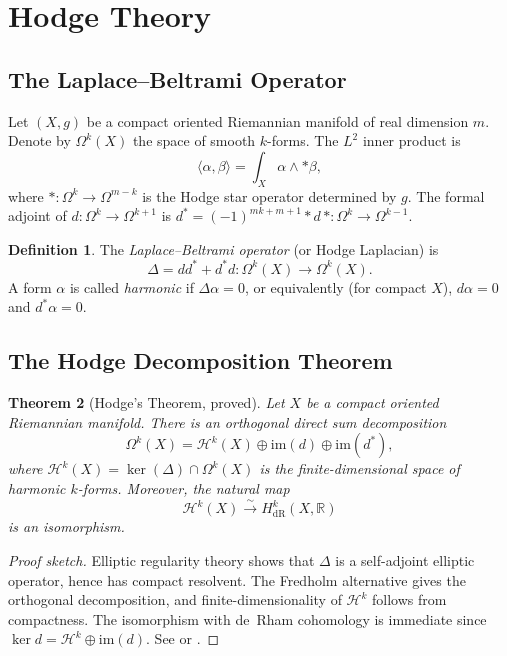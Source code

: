 \documentclass[12pt,a4paper]{amsart}
\newtheorem{theorem}{Theorem}[section]
\theoremstyle{definition}
\newtheorem{definition}[theorem]{Definition}
\theoremstyle{remark}
\begin{document}
\section{Hodge Theory}
\label{sec:hodge-theory}

\subsection{The Laplace–Beltrami Operator}

Let $(X,g)$ be a compact oriented Riemannian manifold of real dimension $m$.
Denote by $\Omega^k(X)$ the space of smooth $k$-forms. The $L^2$ inner product is
\[
  \langle \alpha, \beta \rangle = \int_X \alpha \wedge *\beta,
\]
where $*: \Omega^k \to \Omega^{m-k}$ is the Hodge star operator determined by $g$.
The formal adjoint of $d: \Omega^k \to \Omega^{k+1}$ is
$d^* = (-1)^{mk+m+1} * d\, * : \Omega^k \to \Omega^{k-1}$.

\begin{definition}
The \emph{Laplace–Beltrami operator} (or Hodge Laplacian) is
\[
  \Delta = dd^* + d^*d : \Omega^k(X) \longrightarrow \Omega^k(X).
\]
A form $\alpha$ is called \emph{harmonic} if $\Delta\alpha = 0$, or equivalently
(for compact $X$), $d\alpha = 0$ and $d^*\alpha = 0$.
\end{definition}

\subsection{The Hodge Decomposition Theorem}

\begin{theorem}[Hodge's Theorem, proved]
\label{thm:hodge-main}
Let $X$ be a compact oriented Riemannian manifold. There is an orthogonal direct
sum decomposition
\[
  \Omega^k(X) = \mathcal{H}^k(X) \oplus \mathrm{im}(d) \oplus \mathrm{im}(d^*),
\]
where $\mathcal{H}^k(X) = \ker(\Delta) \cap \Omega^k(X)$ is the finite-dimensional
space of harmonic $k$-forms. Moreover, the natural map
\[
  \mathcal{H}^k(X) \xrightarrow{\;\sim\;} H^k_{\mathrm{dR}}(X, \mathbb{R})
\]
is an isomorphism.
\end{theorem}

\begin{proof}[Proof sketch]
Elliptic regularity theory shows that $\Delta$ is a self-adjoint elliptic operator,
hence has compact resolvent. The Fredholm alternative gives the orthogonal decomposition,
and finite-dimensionality of $\mathcal{H}^k$ follows from compactness. The isomorphism
with de~Rham cohomology is immediate since $\ker d = \mathcal{H}^k \oplus \mathrm{im}(d)$.
See \cite[Ch.~0]{griffiths_harris1978} or \cite[Ch.~4]{warner1983}.
\end{proof}
\end{document}
